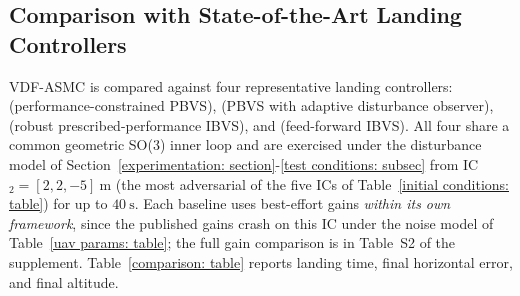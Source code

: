 \subsection{Comparison with State-of-the-Art Landing Controllers}
\label{comparison: subsec}
VDF-ASMC is compared against four representative landing controllers: \cite{lin2022} (performance-constrained PBVS), \cite{zhang2026} (PBVS with adaptive disturbance observer), \cite{lin2023} (robust prescribed-performance IBVS), and \cite{cho2022} (feed-forward IBVS). All four share a common geometric SO(3) inner loop and are exercised under the disturbance model of Section~\ref{experimentation: section}-\ref{test conditions: subsec} from IC$_2=[2,2,-5]~\text{m}$ (the most adversarial of the five ICs of Table~\ref{initial conditions: table}) for up to $40~\text{s}$. Each baseline uses best-effort gains \emph{within its own framework}, since the published gains crash on this IC under the noise model of Table~\ref{uav params: table}; the full gain comparison is in Table~S2 of the supplement. Table~\ref{comparison: table} reports landing time, final horizontal error, and final altitude.

